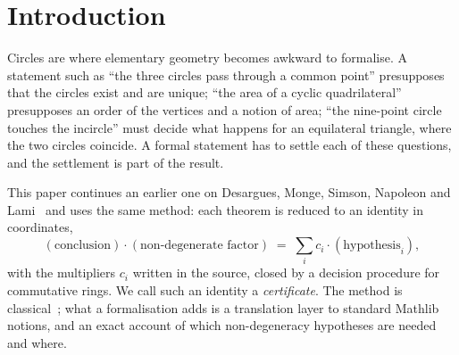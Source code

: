 \documentclass[11pt]{article}
\theoremstyle{definition}
\theoremstyle{remark}
\begin{document}
\begin{abstract}
it. \textbf{Miquel's theorem is not new to formal mathematics either:} it was formalised in
Isabelle/HOL in the Archive of Formal Proofs entry of Freitas Ramos, Barros Hulak and de~Queiroz
(August 2026), and earlier in Coq's HighSchoolGeometry library. Our Miquel statement differs in
assuming only the non-degeneracy conditions that make the three circles exist.
\textbf{Brahmagupta's formula is not new to Lean:} a complete, sorry-free Lean~4 proof is in the
ShadowBench repository (\texttt{epfl-lara/icml-26-lean-challenges}, commit of 12 June 2026). What
our Brahmagupta development adds is limited to statements we did not find there: the
inequality $K^2\le(s-a)(s-b)(s-c)(s-d)$ and the equivalence of equality with Ptolemy's equality,
both for arbitrary four points. For the Malfatti circle construction we found no earlier
formalisation; our searches are not exhaustive, and three of the four searches missed existing
work. The new contributions are therefore the Malfatti formalisation, a second Lean proof of
Feuerbach's theorem, a Miquel statement with fewer hypotheses than the earlier ones, and the
verification methodology with its limits.
\end{abstract}

\section{Introduction}

Circles are where elementary geometry becomes awkward to formalise. A statement such as ``the
three circles pass through a common point'' presupposes that the circles exist and are unique;
``the area of a cyclic quadrilateral'' presupposes an order of the vertices and a notion of area;
``the nine-point circle touches the incircle'' must decide what happens for an equilateral
triangle, where the two circles coincide. A formal statement has to settle each of these
questions, and the settlement is part of the result.

This paper continues an earlier one on Desargues, Monge, Simson, Napoleon and Lami~\cite{PaperA}
and uses the same method: each theorem is reduced to an identity in coordinates,
\[
  (\text{conclusion})\cdot(\text{non-degenerate factor}) \;=\; \sum_i c_i\cdot(\text{hypothesis}_i),
\]
with the multipliers $c_i$ written in the source, closed by a decision procedure for commutative
rings. We call such an identity a \emph{certificate}. The method is classical~\cite{Chou}; what a
formalisation adds is a translation layer to standard Mathlib notions, and an exact account of
which non-degeneracy hypotheses are needed and where.
\end{document}
